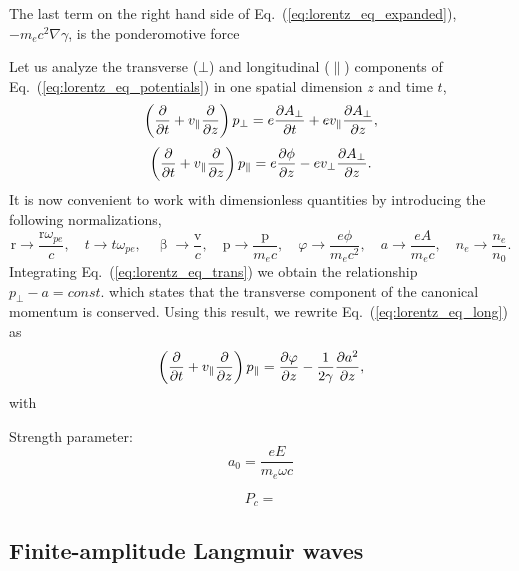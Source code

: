 \documentclass[10pt, a4paper, twoside, openright]{report}
\renewcommand{\vec}[1]{\boldsymbol{\mathrm{#1}}}
\newcommand{\grad}[1]{\nabla #1}
\begin{document}
The last term on the right hand side of Eq.~(\ref{eq:lorentz_eq_expanded}), $ - m_e c^2 \grad{\gamma} $, is the ponderomotive force

Let us analyze the transverse ($ \bot $) and longitudinal ($ \parallel $) components of Eq.~(\ref{eq:lorentz_eq_potentials}) in one spatial dimension $ z $ and time $ t $,
\begin{equation}\label{eq:lorentz_eq_trans}
	\left( \diffp{}{t} + v_{\parallel} \diffp{}{z} \right) p_{\bot} = e \diffp{A_{\bot}}{t} + e v_{\parallel} \diffp{A_{\bot}}{z},
\end{equation}
\begin{equation}\label{eq:lorentz_eq_long}
	\left( \diffp{}{t} + v_{\parallel} \diffp{}{z} \right) p_{\parallel} = e \diffp{\phi}{z} - e v_{\bot} \diffp{A_{\bot}}{z}.
\end{equation}
It is now convenient to work with dimensionless quantities by introducing the following normalizations,
\begin{equation}\label{eq:normalizations}
	\vec{r} \rightarrow \frac{\vec{r} \omega_{pe}}{c}, \quad t \rightarrow t \omega_{pe}, \quad \vec{\upbeta} \rightarrow \frac{\vec{v}}{c}, \quad \vec{p} \rightarrow \frac{\vec{p}}{m_e c}, \quad \varphi \rightarrow \frac{e \phi}{m_e c^2}, \quad a \rightarrow \frac{e A}{m_e c}, \quad n_e \rightarrow \frac{n_e}{n_0}.
\end{equation}
Integrating Eq.~(\ref{eq:lorentz_eq_trans}) we obtain the relationship $ p_{\bot} - a = const. $ which states that the transverse component of the canonical momentum is conserved. Using this result, we rewrite Eq.~(\ref{eq:lorentz_eq_long}) as
\begin{equation}\label{key}
	\left( \diffp{}{t} + v_{\parallel} \diffp{}{z} \right) p_{\parallel} = \diffp{\varphi}{z} - \frac{1}{2 \gamma} \diffp{a^2}{z},
\end{equation}
with 

Strength parameter: 
\begin{equation}\label{key}
	a_0 = \frac{e E}{m_e \omega c}
\end{equation}

\begin{equation}\label{key}
	P_c = 
\end{equation}


\subsection{Finite-amplitude Langmuir waves}
%
\end{document}
